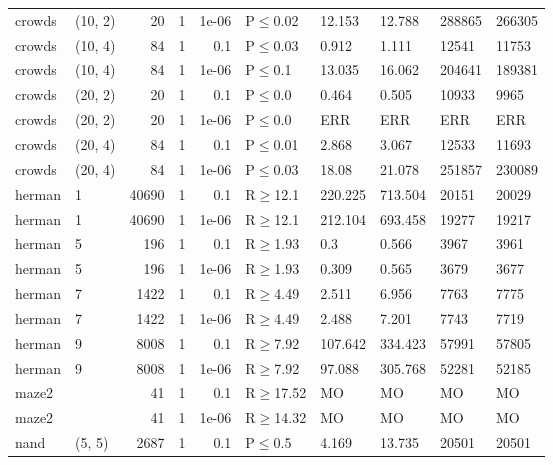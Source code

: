 \begin{longtable}{llrrrlllll}
 crowds        & (10, 2)   &     	20 & 1 & 1e-06 & P$\leq$0.02  & 12.153  & 12.788   & 288865  & 266305  \\
 crowds        & (10, 4)   &     	84 & 1 & 0.1   & P$\leq$0.03  & 0.912   & 1.111    & 12541   & 11753   \\
 crowds        & (10, 4)   &     	84 & 1 & 1e-06 & P$\leq$0.1   & 13.035  & 16.062   & 204641  & 189381  \\
 crowds        & (20, 2)   &     	20 & 1 & 0.1   & P$\leq$0.0   & 0.464   & 0.505    & 10933   & 9965    \\
 crowds        & (20, 2)   &     	20 & 1 & 1e-06 & P$\leq$0.0   & ERR     & ERR      & ERR     & ERR     \\
 crowds        & (20, 4)   &     	84 & 1 & 0.1   & P$\leq$0.01  & 2.868   & 3.067    & 12533   & 11693   \\
 crowds        & (20, 4)   &     	84 & 1 & 1e-06 & P$\leq$0.03  & 18.08   & 21.078   & 251857  & 230089  \\
 herman        & 1         &  	40690 & 1 & 0.1   & R$\geq$12.1  & 220.225 & 713.504  & 20151   & 20029   \\
 herman        & 1         &  	40690 & 1 & 1e-06 & R$\geq$12.1  & 212.104 & 693.458  & 19277   & 19217   \\
 herman        & 5         &    	196 & 1 & 0.1   & R$\geq$1.93  & 0.3     & 0.566    & 3967    & 3961    \\
 herman        & 5         &    	196 & 1 & 1e-06 & R$\geq$1.93  & 0.309   & 0.565    & 3679    & 3677    \\
 herman        & 7         &   	1422 & 1 & 0.1   & R$\geq$4.49  & 2.511   & 6.956    & 7763    & 7775    \\
 herman        & 7         &   	1422 & 1 & 1e-06 & R$\geq$4.49  & 2.488   & 7.201    & 7743    & 7719    \\
 herman        & 9         &   	8008 & 1 & 0.1   & R$\geq$7.92  & 107.642 & 334.423  & 57991   & 57805   \\
 herman        & 9         &   	8008 & 1 & 1e-06 & R$\geq$7.92  & 97.088  & 305.768  & 52281   & 52185   \\
 maze2         &           &     	41 & 1 & 0.1   & R$\geq$17.52 & MO      & MO       & MO      & MO      \\
 maze2         &           &     	41 & 1 & 1e-06 & R$\geq$14.32 & MO      & MO       & MO      & MO      \\
 nand          & (5, 5)    &   	2687 & 1 & 0.1   & P$\leq$0.5   & 4.169   & 13.735   & 20501   & 20501   \\

\end{longtable}
